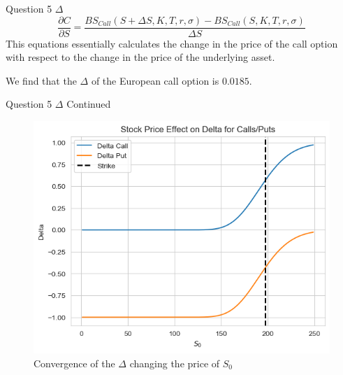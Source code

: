 \documentclass[compress,12pt]{beamer}
\begin{document}
\begin{frame}{Question 5 $\Delta$}
      \begin{equation*}
            \frac{\partial C}{\partial S} = \frac{BS_{Call}(S+\Delta S, K, T,r,\sigma) - BS_{Call}(S, K, T,r,\sigma)}{\Delta S}
      \end{equation*}
      This equations essentially calculates the change in the price of the call option with respect to the change in the price of the underlying asset.
      \begin{tcolorbox}
            We find that the $\Delta$ of the European call option is $\boxed{0.0185}$.
      \end{tcolorbox}
\end{frame}

\begin{frame}{Question 5 $\Delta$ Continued}
      \begin{figure}
            \centering
            \includegraphics[scale=0.6]{./imgs/delta.png}
            \caption{Convergence of the $\Delta$ changing the price of $S_0$}
      \end{figure}

\end{frame}
\end{document}

